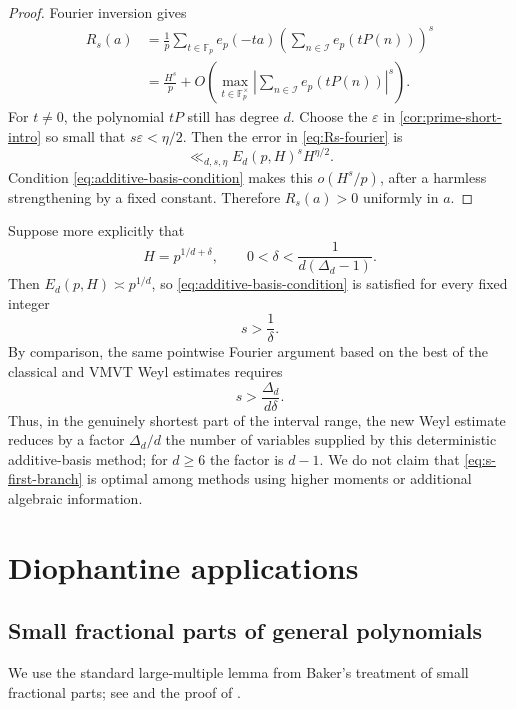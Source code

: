 \documentclass[11pt,reqno]{amsart}
\numberwithin{equation}{section}
\theoremstyle{definition}
\theoremstyle{remark}
\begin{document}
\begin{proof}
Fourier inversion gives
\begin{align}\label{eq:Rs-fourier}
  R_s(a)
  &=\frac1p\sum_{t\in\mathbb F_p}
  e_p(-ta)
  \left(\sum_{n\in\mathcal I}e_p(tP(n))\right)^s\\
  &=\frac{H^s}{p}
  +O\left(
  \max_{t\in\mathbb F_p^\times}
  \left|\sum_{n\in\mathcal I}e_p(tP(n))\right|^s
  \right).\nonumber
\end{align}
For $t\ne0$, the polynomial $tP$ still has degree $d$.  Choose the $\varepsilon$ in \cref{cor:prime-short-intro} so small that $s\varepsilon<\eta/2$.  Then the error in \eqref{eq:Rs-fourier} is
\[
  \ll_{d,s,\eta}E_d(p,H)^sH^{\eta/2}.
\]
Condition \eqref{eq:additive-basis-condition} makes this $o(H^s/p)$, after a harmless strengthening by a fixed constant.  Therefore $R_s(a)>0$ uniformly in $a$.
\end{proof}

Suppose more explicitly that
\[
  H=p^{1/d+\delta},
  \qquad
  0<\delta<\frac1{d(\Delta_d-1)}.
\]
Then $E_d(p,H)\asymp p^{1/d}$, so \eqref{eq:additive-basis-condition} is satisfied for every fixed integer
\begin{equation}\label{eq:s-first-branch}
  s>\frac1\delta.
\end{equation}
By comparison, the same pointwise Fourier argument based on the best of
the classical and VMVT Weyl estimates requires
\begin{equation}\label{eq:s-standard-comparison}
  s>\frac{\Delta_d}{d\delta}.
\end{equation}
Thus, in the genuinely shortest part of the interval range, the new Weyl
estimate reduces by a factor $\Delta_d/d$ the number of variables supplied by
this deterministic additive-basis method; for $d\ge6$ the factor is $d-1$.
We do not claim that \eqref{eq:s-first-branch} is optimal among methods using
higher moments or additional algebraic information.

\section{Diophantine applications}\label{sec:diophantine-applications}

\subsection{Small fractional parts of general polynomials}

We use the standard large-multiple lemma from Baker's treatment of small fractional parts; see \cite[Theorem~2.2]{Baker1986} and the proof of \cite[Theorem~1]{Baker2016}.
\end{document}
